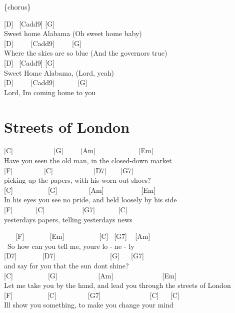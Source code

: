 \documentclass[
  letterpaper,
  twoside=false]{scrbook}
\begin{document}
\{chorus\}

{[}D{]} ~{[}Cadd9{]} {[}G{]} ~ ~\\
Sweet home Alabama (Oh sweet home baby)\\
{[}D{]} ~ ~ ~{[}Cadd9{]} ~ ~ ~{[}G{]} ~\\
Where the skies are so blue (And the governor\textquotesingle s true)\\
{[}D{]} ~{[}Cadd9{]} {[}G{]}\\
Sweet Home Alabama, (Lord, yeah)\\
{[}D{]} ~ ~ ~{[}Cadd9{]} ~ ~ ~ ~{[}G{]}\\
Lord, I\textquotesingle m coming home to you

\hypertarget{streets-of-london}{%
\chapter{Streets of London}\label{streets-of-london}}

{[}C{]} ~ ~ ~ ~ ~ ~ ~{[}G{]} ~ ~ ~{[}Am{]} ~ ~ ~ ~ ~ ~ ~ {[}Em{]}\\
Have you seen the old man, in the closed-down market\\
{[}F{]} ~ ~ ~ ~ ~ {[}C{]} ~ ~ ~ ~ ~ ~ ~{[}D7{]} ~ ~ {[}G7{]}\\
picking up the papers, with his worn-out shoes?\\
{[}C{]} ~ ~ ~ ~ ~ ~{[}G{]} ~ ~ ~ ~ ~ {[}Am{]} ~ ~ ~ ~ ~ ~ {[}Em{]}\\
In his eyes you see no pride, and held loosely by his side\\
{[}F{]} ~ ~ ~ ~{[}C{]} ~ ~ ~ ~ ~ ~ {[}G7{]} ~ ~ ~ ~{[}C{]}\\
yesterday\textquotesingle s papers, telling yesterday\textquotesingle s
news

~ ~ {[}F{]} ~ ~ ~ ~ {[}Em{]} ~ ~ ~ ~ ~ ~{[}C{]} ~{[}G7{]} ~ {[}Am{]}\\
\hspace*{0.333em} ~So how can you tell me, you\textquotesingle re lo -
ne - ly\\
{[}D7{]} ~ ~ ~ ~ {[}D7{]} ~ ~ ~ ~ ~ ~ ~ ~ ~ {[}G{]} ~ ~{[}G7{]}\\
\hspace*{0.333em}and say for you that the sun don\textquotesingle t
shine?\\
{[}C{]} ~ ~ ~ ~ ~ ~{[}G{]} ~ ~ ~ ~ ~ ~ ~{[}Am{]} ~ ~ ~ ~ ~ ~ ~ ~
{[}Em{]}\\
Let me take you by the hand, and lead you through the streets of
London\\
{[}F{]} ~ ~ ~ ~ ~ ~{[}C{]} ~ ~ ~ ~ ~ {[}G7{]} ~ ~ ~ ~ ~ ~ ~ ~ {[}C{]} ~
~{[}C{]}\\
\hspace*{0.333em}I\textquotesingle ll show you something, to make you
change your mind
\end{document}
